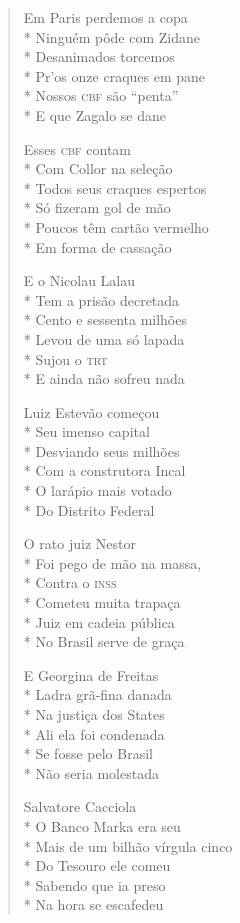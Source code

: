 \begin{verse}
Em Paris perdemos a copa\\*
Ninguém pôde com Zidane\\*
Desanimados torcemos\\*
Pr'os onze craques em pane\\*
Nossos \textsc{cbf} são “penta”\\*
E que Zagalo se dane

Esses \textsc{cbf} contam\\*
Com Collor na seleção\\*
Todos seus craques espertos\\*
Só fizeram gol de mão\\*
Poucos têm cartão vermelho\\*
Em forma de cassação

E o Nicolau Lalau\\*
Tem a prisão decretada\\*
Cento e sessenta milhões\\*
Levou de uma só lapada\\*
Sujou o \textsc{trt}\\*
E ainda não sofreu nada

Luiz Estevão começou\\*
Seu imenso capital\\*
Desviando seus milhões\\*
Com a construtora Incal\\*
O larápio mais votado\\*
Do Distrito Federal

O rato juiz Nestor\\*
Foi pego de mão na massa,\\*
Contra o \textsc{inss}\\*
Cometeu muita trapaça\\*
Juiz em cadeia pública\\*
No Brasil serve de graça

E Georgina de Freitas\\*
Ladra grã-fina danada\\*
Na justiça dos States\\*
Ali ela foi condenada\\*
Se fosse pelo Brasil\\*
Não seria molestada

Salvatore Cacciola\\*
O Banco Marka era seu\\*
Mais de um bilhão vírgula cinco\\*
Do Tesouro ele comeu\\*
Sabendo que ia preso\\*
Na hora se escafedeu


\end{verse}
